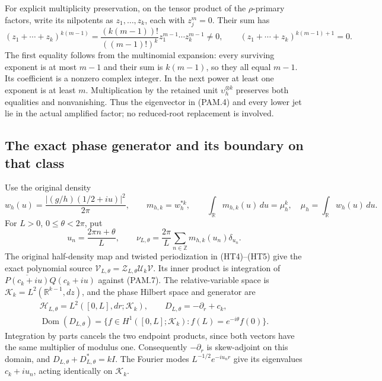 For explicit multiplicity preservation, on the tensor product of the
\(\rho\)-primary factors, write its nilpotents as \(z_1,\ldots,z_k\),
each with \(z_j^m=0\). Their sum has
\[
 (z_1+\cdots+z_k)^{k(m-1)}
 =\frac{(k(m-1))!}{((m-1)!)^k}
                 z_1^{m-1}\cdots z_k^{m-1}\ne0,\qquad
 (z_1+\cdots+z_k)^{k(m-1)+1}=0.
 \tag{PAM.5}\label{eq:pam-nilpotents}
\]
The first equality follows from the multinomial expansion: every
surviving exponent is at most \(m-1\) and their sum is \(k(m-1)\),
so they all equal \(m-1\). Its coefficient is a nonzero complex
integer. In the next power at least one exponent is at least \(m\).
Multiplication by the retained unit \(\upsilon_h^{\otimes k}\)
preserves both equalities and nonvanishing. Thus the eigenvector
in (PAM.4) and every lower jet lie in the actual amplified factor;
no reduced-root replacement is involved.

\subsection{The exact phase generator and its boundary on that class}

Use the original density
\[
 w_h(u)=\frac{|(g/h)(1/2+iu)|^2}{2\pi},\qquad
 m_{h,k}=w_h^{*k},\qquad
 \int_{\mathbb R}m_{h,k}(u)\,du=\mu_h^k,\quad
 \mu_h=\int_{\mathbb R}w_h(u)\,du .
 \tag{PAM.6}\label{eq:pam-density}
\]
For \(L>0\), \(0\le\theta<2\pi\), put
\[
 u_n=\frac{2\pi n+\theta}{L},\qquad
 \nu_{L,\theta}=\frac{2\pi}{L}
       \sum_{n\in\mathbb Z}m_{h,k}(u_n)\delta_{u_n}.
 \tag{PAM.7}\label{eq:pam-phase}
\]
The original half-density map and twisted periodization in (HT4)--(HT5)
give the exact polynomial source
\(\mathcal V_{L,\theta}=\mathcal Z_{L,\theta}\mathcal U_k\mathcal V\).
Its inner product is integration of
\(\overline{P(c_k+iu)}Q(c_k+iu)\) against (PAM.7).
The relative-variable space is
\(\mathcal K_k=L^2(\mathbb R^{k-1},dz)\), and the phase Hilbert
space and generator are
\[
 \begin{gathered}
 \mathcal H_{L,\theta}
       =L^2([0,L],dr;\mathcal K_k),\qquad
 D_{L,\theta}=-\partial_r+c_k,\\
 \operatorname{Dom}(D_{L,\theta})
 =\{f\in H^1([0,L];\mathcal K_k):
                        f(L)=e^{-i\theta}f(0)\}.
 \end{gathered}
 \tag{PAM.8}\label{eq:pam-generator}
\]
Integration by parts cancels the two endpoint products, since both
vectors have the same multiplier of modulus one. Consequently
\(-\partial_r\) is skew-adjoint on this domain, and
\(D_{L,\theta}+D_{L,\theta}^*=kI\).
The Fourier modes \(L^{-1/2}e^{-iu_nr}\) give its eigenvalues
\(c_k+iu_n\), acting identically on \(\mathcal K_k\).

